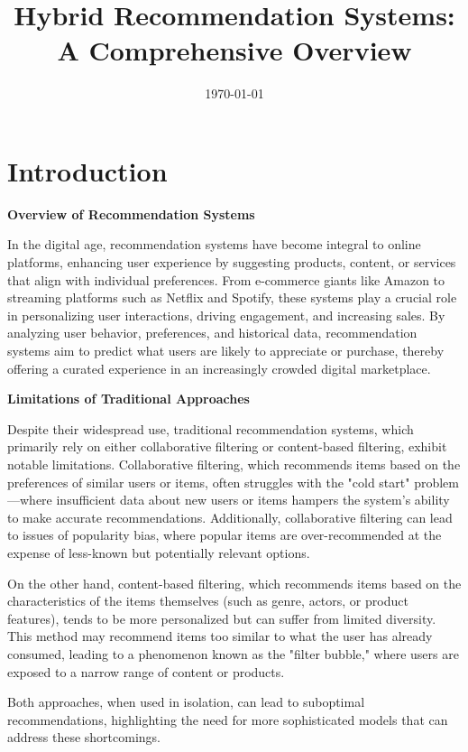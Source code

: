 \documentclass{article}
\title{Hybrid Recommendation Systems: A Comprehensive Overview}
\date{\today}
\begin{document}
\maketitle

\section{Introduction}

\textbf{Overview of Recommendation Systems}

In the digital age, recommendation systems have become integral to online platforms, enhancing user experience by suggesting products, content, or services that align with individual preferences. From e-commerce giants like Amazon to streaming platforms such as Netflix and Spotify, these systems play a crucial role in personalizing user interactions, driving engagement, and increasing sales. By analyzing user behavior, preferences, and historical data, recommendation systems aim to predict what users are likely to appreciate or purchase, thereby offering a curated experience in an increasingly crowded digital marketplace.

\textbf{Limitations of Traditional Approaches}

Despite their widespread use, traditional recommendation systems, which primarily rely on either collaborative filtering or content-based filtering, exhibit notable limitations. Collaborative filtering, which recommends items based on the preferences of similar users or items, often struggles with the "cold start" problem—where insufficient data about new users or items hampers the system's ability to make accurate recommendations. Additionally, collaborative filtering can lead to issues of popularity bias, where popular items are over-recommended at the expense of less-known but potentially relevant options.

On the other hand, content-based filtering, which recommends items based on the characteristics of the items themselves (such as genre, actors, or product features), tends to be more personalized but can suffer from limited diversity. This method may recommend items too similar to what the user has already consumed, leading to a phenomenon known as the "filter bubble," where users are exposed to a narrow range of content or products.

Both approaches, when used in isolation, can lead to suboptimal recommendations, highlighting the need for more sophisticated models that can address these shortcomings.
\end{document}
